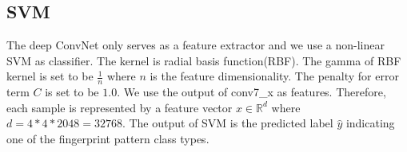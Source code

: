 \subsection{SVM}
\label{sec_svm}
The deep ConvNet only serves as a feature extractor and we use a non-linear SVM as classifier. The kernel is radial basis function(RBF). The gamma of RBF kernel  is set to be $\frac{1}{n}$ where $n$ is the feature dimensionality. The penalty for error term $C$ is set to be $1.0$. 
%
We use the output of  conv7\_x as features. Therefore, each sample is represented by a feature vector $x \in \mathbb{R}^d$ where $d=4*4*2048=32768$. The output of SVM is the predicted label $\hat{y} $ indicating one of the fingerprint pattern class types.







